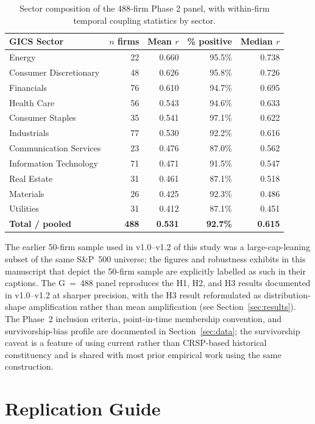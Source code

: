 \documentclass[preprint,12pt,authoryear]{elsarticle}
\begin{document}
\begin{table}[H]
\centering
\small
\caption{Sector composition of the 488-firm Phase 2 panel, with within-firm temporal coupling statistics by sector.}
\label{tab:sector_breakdown_g488}
\begin{tabular}{lrrrr}
\toprule
GICS Sector & $n$ firms & Mean $r$ & \% positive & Median $r$ \\
\midrule
Energy & 22 & 0.660 & 95.5\% & 0.738 \\
Consumer Discretionary & 48 & 0.626 & 95.8\% & 0.726 \\
Financials & 76 & 0.610 & 94.7\% & 0.695 \\
Health Care & 56 & 0.543 & 94.6\% & 0.633 \\
Consumer Staples & 35 & 0.541 & 97.1\% & 0.622 \\
Industrials & 77 & 0.530 & 92.2\% & 0.616 \\
Communication Services & 23 & 0.476 & 87.0\% & 0.562 \\
Information Technology & 71 & 0.471 & 91.5\% & 0.547 \\
Real Estate & 31 & 0.461 & 87.1\% & 0.518 \\
Materials & 26 & 0.425 & 92.3\% & 0.486 \\
Utilities & 31 & 0.412 & 87.1\% & 0.451 \\
\midrule
\textbf{Total / pooled} & \textbf{488} & \textbf{0.531} & \textbf{92.7\%} & \textbf{0.615} \\
\bottomrule
\end{tabular}
\end{table}

The earlier 50-firm sample used in v1.0--v1.2 of this study was a large-cap-leaning subset of the same S\&P~500 universe; the figures and robustness exhibits in this manuscript that depict the 50-firm sample are explicitly labelled as such in their captions. The G~=~488 panel reproduces the H1, H2, and H3 results documented in v1.0--v1.2 at sharper precision, with the H3 result reformulated as distribution-shape amplification rather than mean amplification (see Section~\ref{sec:results}). The Phase~2 inclusion criteria, point-in-time membership convention, and survivorship-bias profile are documented in Section~\ref{sec:data}; the survivorship caveat is a feature of using current rather than CRSP-based historical constituency and is shared with most prior empirical work using the same construction.

\section{Replication Guide}
\label{app:replication}
\end{document}
